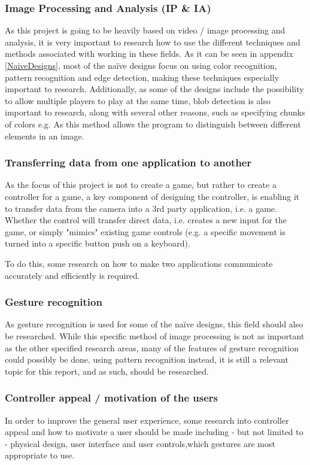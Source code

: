 \subsubsection{Image Processing and Analysis (IP \& IA)}
As this project is going to be heavily based on video / image processing and analysis, it is very important to research how to use the different techniques and methods associated with working in these fields. As it can be seen in appendix \ref{NaiveDesigns}, most of the naïve designs focus on using color recognition, pattern recognition and edge detection, making these techniques especially important to research. Additionally, as some of the designs include the possibility to allow multiple players to play at the same time, blob detection is also important to research, along with several other reasons, such as specifying chunks of colors e.g. As this method allows the program to distinguish between different elements in an image.

\subsubsection{Transferring data from one application to another}
As the focus of this project is not to create a game, but rather to create a controller for a game, a key component of designing the controller, is enabling it to transfer data from the camera into a 3rd party application, i.e. a game. Whether the control will transfer direct data, i.e. creates a new input for the game, or simply "mimics" existing game controls (e.g. a specific movement is turned into a specific button push on a keyboard).

To do this, some research on how to make two applications communicate accurately and efficiently is required.

\subsubsection{Gesture recognition}
As gesture recognition is used for some of the naïve designs, this field should also be researched. While this specific method of image processing is not as important as the other specified research areas, many of the features of gesture recognition could possibly be done, using pattern recognition instead, it is still a relevant topic for this report, and as such, should be researched.

\subsubsection{Controller appeal / motivation of the users}
In order to improve the general user experience, some research into controller appeal and how to motivate a user should be made including - but not limited to - physical design, user interface and user controls,which gestures are most appropriate to use.

